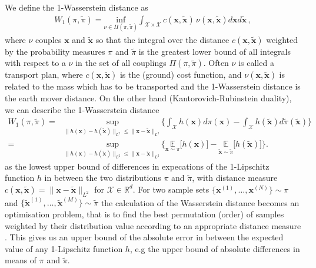 We define the 1-Wasserstein distance as
\begin{align}
	W_1(\pi,\tilde{\pi}) = \underset{  \nu \in \Pi(\pi,\tilde{\pi}) }{ \text{inf}}\int_{\mathcal{X} \times \mathcal{X}} c(\bm{x},\tilde{\bm{x}}) \, \nu(\bm{x},\tilde{\bm{x}}) d\bm{x} d\tilde{\bm{x}}
	\label{eq:wass} \, ,
\end{align}
where $\nu$ couples $\bm{x}$ and $\tilde{\bm{x}}$ so that the integral over the distance $ c(\bm{x},\tilde{\bm{x}}) $ weighted by the probability measures $\pi$ and $\tilde{\pi}$ is the greatest lower bound of all integrals with respect to a $\nu$ in the set of all couplings $ \Pi(\pi,\tilde{\pi})$.
Often $\nu$ is called a transport plan, where $c(\bm{x},\tilde{\bm{x}})$ is the (ground) cost function, and $\nu(\bm{x}, \tilde{\bm{x}})$ is related to the mass which has to be transported and the 1-Wasserstein distance is the earth mover distance.
On the other hand (Kantorovich-Rubinstein duality), we can describe the 1-Wasserstein distance 
\begin{align}
	W_1(\pi,\tilde{\pi})  =& \underset{ \lVert h(\bm{x})- h(\tilde{\bm{x}}) \rVert_{L^2} \leq   \lVert \bm{x} - \tilde{\bm{x}}  \rVert_{L^2} }{ \text{sup}} \Bigg\{  \int_{\mathcal{X}} h(\bm{x}) d \pi (\bm{x})  - \int_{\mathcal{X}} h(\tilde{\bm{x}}) d \tilde{\pi} (\tilde{\bm{x}}) \Bigg\} \\
	=& \underset{ \lVert h(\bm{x})- h(\tilde{\bm{x}}) \rVert_{L^2} \leq \lVert \bm{x} -\tilde{\bm{x}}  \rVert_{L^2} }{ \text{sup}}  \Bigg\{  \underset{\bm{x} \sim  \pi }{\mathbb{E}} \big[ h(\bm{x}) \big]  -  \underset{\tilde{\bm{x}}\sim \tilde{\pi}}{\mathbb{E}} \big[ h(\tilde{\bm{x}}) \big] \Bigg\} .
\end{align}
as the lowest upper bound of differences in expecations of the 1-Lipschitz function $h$ in between the two distributions $\pi$ and $\tilde{\pi}$, with distance measure $c(\bm{x},\tilde{\bm{x}})= \lVert \bm{x} -\tilde{\bm{x}} \rVert_{L^2} $ for $\mathcal{X} \in \mathbb{R}^d$.
For two sample sets $\{ \bm{x}^{(1)},\dots,\bm{x}^{(N)}\} \sim \pi$ and $\{\tilde{ \bm{x}}^{(1)},\dots,\tilde{\bm{x}}^{(M)}\} \sim \tilde{\pi}$ the calculation of the Wasserstein distance becomes an optimisation problem, that is to find the best permutation (order) of samples weighted by their distribution value according to an appropriate distance measure \cite{feydy2020OT}.
This gives us an upper bound of the absolute error in between the expected value of any 1-Lipschitz function $h$, e.g the upper bound of absolute differences in means of $\pi$ and $\tilde{\pi}$. 


